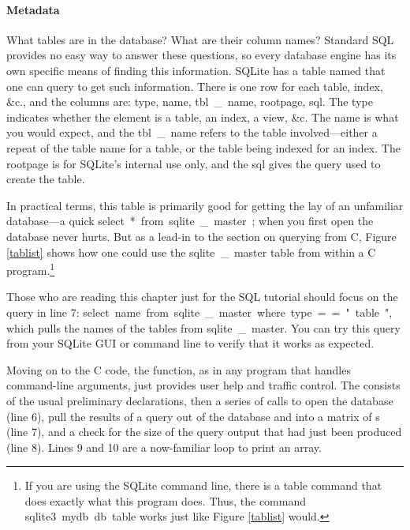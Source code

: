 \paragraph{Metadata} What tables are in the database? What are their
column names? Standard SQL provides no easy way to answer these questions, so every database
engine has its own specific means of finding this information. SQLite
has a table named  that one can query to get such
information. There is one row for each table, index, \&c., and the
columns are: \si{type}, \si{name},
\si{tbl\_name}, \si{rootpage}, \si{sql}.  The \si{type} indicates whether
the element is a table, an index, a view, \&c.  The \si{name} is what you
would expect, and the \si{tbl\_name} refers to the table involved---either
a repeat of the table name for a table, or the table being indexed for
an index. The \si{rootpage} is for SQLite's internal use only, and the
\si{sql} gives the query used to create the table.

In practical terms, this table is primarily good for getting the lay of
an unfamiliar database---a quick \si{select * from sqlite\_master;} 
when you first open the database never hurts.
But as a lead-in to the section on querying from C, Figure \ref{tablist}
shows how one could use the \si{sqlite\_master} table from within a C
program.\footnote{If you are using the SQLite command line, there is a
\si{.table} command that does exactly what this program does. Thus, the
command  \si{sqlite3 mydb.db .table} works just like Figure \ref{tablist}
would.}

Those who are reading this chapter just for the SQL tutorial should
focus on the query in line 7: \si{select name from sqlite\_master where
type == "table"}, which pulls the names of the tables from
\si{sqlite\_master}. You can try this query from your SQLite GUI or
command line to verify that it works as expected.


\lstset{numbers=left, numberstyle=\scshape}
 
\lstset{numbers=none}

Moving on to the C code, the  function, as in any program that
handles command-line arguments, just provides user help and traffic
control.  The  consists of the usual preliminary
declarations, then a series of calls to open the database (line 6), pull
the results of a query out of the database and into a matrix of s
(line 7), and a check for the size of the query output that had just been produced
(line 8). Lines 9 and 10 are a now-familiar loop to print an array.

